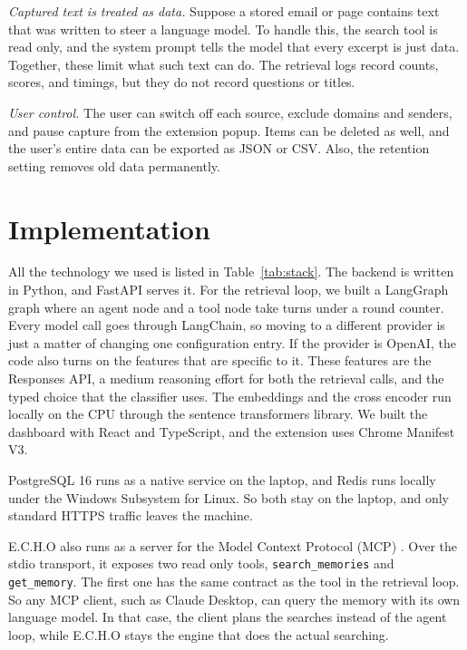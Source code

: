 \documentclass[conference]{IEEEtran}
\begin{document}
\textit{Captured text is treated as data.} Suppose a stored email or page contains text that was written to steer a language model. To handle this, the search tool is read only, and the system prompt tells the model that every excerpt is just data. Together, these limit what such text can do. The retrieval logs record counts, scores, and timings, but they do not record questions or titles.

\textit{User control.} The user can switch off each source, exclude domains and senders, and pause capture from the extension popup. Items can be deleted as well, and the user's entire data can be exported as JSON or CSV. Also, the retention setting removes old data permanently.

\section{Implementation}\label{sec:impl}
All the technology we used is listed in Table~\ref{tab:stack}. The backend is written in Python, and FastAPI serves it. For the retrieval loop, we built a LangGraph graph \cite{b5} where an agent node and a tool node take turns under a round counter. Every model call goes through LangChain, so moving to a different provider is just a matter of changing one configuration entry. If the provider is OpenAI, the code also turns on the features that are specific to it. These features are the Responses API, a medium reasoning effort for both the retrieval calls, and the typed choice that the classifier uses. The embeddings and the cross encoder run locally on the CPU through the sentence transformers library. We built the dashboard with React and TypeScript, and the extension uses Chrome Manifest V3.

PostgreSQL 16 runs as a native service on the laptop, and Redis runs locally under the Windows Subsystem for Linux. So both stay on the laptop, and only standard HTTPS traffic leaves the machine.

E.C.H.O also runs as a server for the Model Context Protocol (MCP) \cite{b17}. Over the stdio transport, it exposes two read only tools, \texttt{search\_memories} and \texttt{get\_memory}. The first one has the same contract as the tool in the retrieval loop. So any MCP client, such as Claude Desktop, can query the memory with its own language model. In that case, the client plans the searches instead of the agent loop, while E.C.H.O stays the engine that does the actual searching.
\end{document}
